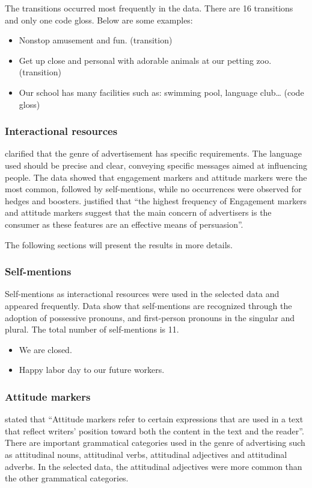\documentclass[english]{textolivre}
\begin{document}
The transitions occurred most frequently in the data. There are 16 transitions and only one code gloss. Below are some examples:

\begin{itemize}
    \item Nonstop amusement and fun. (transition)
    \item Get up close and personal with adorable animals at our petting zoo. (transition)
    \item Our school has many facilities such as: swimming pool, language club… (code gloss)
\end{itemize}

\subsubsection{Interactional resources}\label{sec-listas}
\textcite{kotler_marketing_2007} clarified that the genre of advertisement has specific requirements. The language used should be precise and clear, conveying specific messages aimed at influencing people. The data showed that engagement markers and attitude markers were the most common, followed by self-mentions, while no occurrences were observed for hedges and boosters. \textcite[p.~28]{al-subhi_metadiscourse_2022} justified that “the highest frequency of Engagement markers and attitude markers suggest that the main concern of advertisers is the consumer as these features are an effective means of persuasion”.

The following sections will present the results in more details.


\subsubsection{Self-mentions}\label{sec-figuras-tabelas}
Self-mentions as interactional resources were used in the selected data and appeared frequently. Data show that self-mentions are recognized through the adoption of possessive pronouns, and first-person pronouns in the singular and plural. The total number of self-mentions is 11.

\begin{itemize}
    \item We are closed.
    \item Happy labor day to our future workers.
\end{itemize}

\subsubsection{Attitude markers}
\textcite[p.~31]{abdul-qadir_attitude_2015} stated that “Attitude markers refer to certain expressions that are used in a text that reflect writers’ position toward both the content in the text and the reader”. There are important grammatical categories used in the genre of advertising such as attitudinal nouns, attitudinal verbs, attitudinal adjectives and attitudinal adverbs. In the selected data, the attitudinal adjectives were more common than the other grammatical categories.
\end{document}
